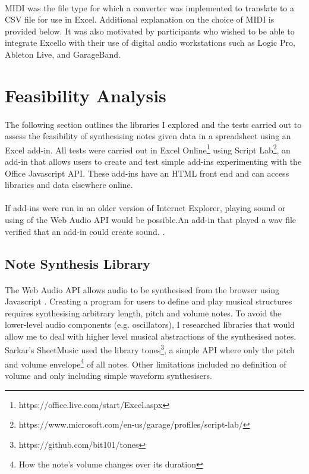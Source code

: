 \paragraph{} MIDI was the file type for which a converter was implemented to translate to a CSV file for use in Excel. Additional explanation on the choice of MIDI is provided below. It was also motivated by participants who wished to be able to integrate Excello with their use of digital audio workstations such as Logic Pro, Ableton Live, and GarageBand.

\section{Feasibility Analysis}

\paragraph{} The following section outlines the libraries I explored and the tests carried out to assess the feasibility of synthesising notes given data in a spreadsheet using an Excel add-in. All tests were carried out in Excel Online\footnote{https://office.live.com/start/Excel.aspx} using Script Lab\footnote{https://www.microsoft.com/en-us/garage/profiles/script-lab/}, an add-in that allows users to create and test simple add-ins experimenting with the Office Javascript API. These add-ins have an HTML front end and can access libraries and data elsewhere online.

\paragraph{} If add-ins were run in an older version of Internet Explorer, playing sound or using of the Web Audio API would be possible.An add-in that played a wav file verified that an add-in could create sound. \cite{mozilla:webaudioapi}.

\subsection{Note Synthesis Library}

\paragraph{} The Web Audio API allows audio to be synthesised from the browser using Javascript \cite{mozilla:webaudioapi}. Creating a program for users to define and play musical structures requires synthesising arbitrary length, pitch and volume notes. To avoid the lower-level audio components (e.g. oscillators), I researched libraries that would allow me to deal with higher level musical abstractions of the synthesised notes. Sarkar's SheetMusic used the library tones\footnote{https://github.com/bit101/tones}, a simple API where only the pitch and volume envelope\footnote{How the note's volume changes over its duration} of all notes. Other limitations included no definition of volume and only including simple waveform synthesisers.

